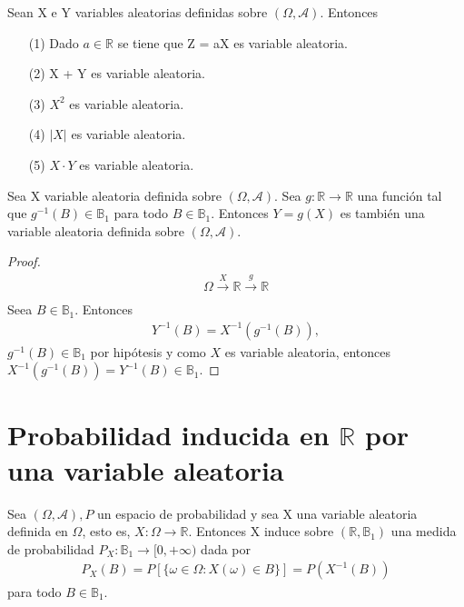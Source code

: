 \begin{prop}
Sean X e Y variables aleatorias definidas sobre $(\Omega, \mathcal{A})$. Entonces
\begin{enumerate}
    \item[(1)] Dado $a \in \mathbb{R}$ se tiene que Z = aX es variable aleatoria.
    \item[(2)] X + Y es variable aleatoria.
    \item[(3)] $X^2$ es variable aleatoria.
    \item[(4)] $|X|$ es variable aleatoria.
    \item[(5)] $X \cdot Y$ es variable aleatoria.
\end{enumerate}
\end{prop}

\begin{teo}
Sea X variable aleatoria definida sobre  $(\Omega, \mathcal{A})$. Sea $g: \mathbb{R} \longrightarrow \mathbb{R}$ una función tal que $g^{-1}(B) \in \mathbb{B}_1$ para todo $B \in \mathbb{B}_1$. Entonces $Y = g(X)$ es también una variable aleatoria definida sobre  $(\Omega, \mathcal{A})$.
\end{teo}

\begin{proof}
\begin{align*}
    \Omega \xrightarrow[]{X} \mathbb{R} \xrightarrow[]{g} \mathbb{R}
\end{align*}
Seea $B \in \mathbb{B}_1$. Entonces
\begin{align*}
    Y^{-1}(B) = X^{-1}(g^{-1}(B)),
\end{align*}
$g^{-1}(B) \in \mathbb{B}_1$ por hipótesis y como $X$ es variable aleatoria, entonces $X^{-1}(g^{-1}(B)) = Y^{-1}(B) \in \mathbb{B}_1$.
\end{proof}

\section{Probabilidad inducida en $\mathbb{R}$ por una variable aleatoria}
\begin{prop}
Sea $(\Omega, \mathcal{A}), P$ un espacio de probabilidad y sea X una variable aleatoria definida en $\Omega$, esto es, $X: \Omega \longrightarrow \mathbb{R}$. Entonces X induce sobre $(\mathbb{R}, \mathbb{B}_1)$ una medida de probabilidad $P_X : \mathbb{B}_1 \longrightarrow [0,+\infty)$ dada por
\begin{align*}
    P_X(B) = P[\{\omega \in \Omega : X(\omega) \in B\}] = P(X^{-1}(B))
\end{align*}
para todo $B \in \mathbb{B}_1$.
\end{prop}